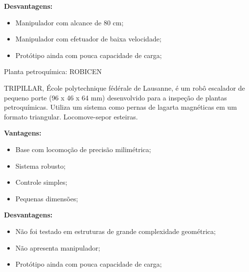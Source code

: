 \textbf{Desvantagens:}
\begin{itemize}
  \item Manipulador com alcance de 80 cm;
  \item Manipulador com efetuador de baixa velocidade;
  \item Protótipo ainda com pouca capacidade de carga;
\end{itemize}

Planta petroquímica: ROBICEN

TRIPILLAR, École polytechnique fédérale de Lausanne, é um robô escalador de
pequeno porte (96 x 46 x 64 mm) desenvolvido para a inspeção de plantas
petroquímicas. Utiliza um sistema como pernas de lagarta magnéticas em um
formato triangular. Locomove-sepor esteiras.

\textbf{Vantagens:}
\begin{itemize}
  \item Base com locomoção de precisão milimétrica;
  \item Sistema robusto;
  \item Controle simples;
  \item Pequenas dimensões; 
\end{itemize}

\textbf{Desvantagens:}
\begin{itemize}
  \item Não foi testado em estruturas de grande complexidade geométrica; 
  \item Não apresenta manipulador;
  \item Protótipo ainda com pouca capacidade de carga;
\end{itemize}
   
